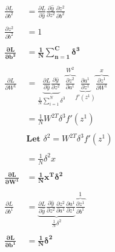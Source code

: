 \documentclass{article}
\begin{document}
	\begin{align*}
		\frac{\partial L}{\partial b^2} &= \frac{\partial L}{\partial \hat{y}}\frac{\partial \hat{y}}{\partial z^2}\frac{\partial z^2}{\partial b^2}\\ \\
		\frac{\partial z^2}{\partial b^2} &= 1\\\\
		\boldsymbol{\frac{\partial L}{\partial b^2}} & \boldsymbol{=\frac{1}{N}\sum_{n=1}^C\delta^3}
	\\
	\\
		\frac{\partial L}{\partial W^1} &=\underbrace{ \frac{\partial L}{\partial \hat{y}}\frac{\partial \hat{y}}{\partial z^2}}_{\frac{1}{N}\sum_{i=1}^N\delta^3}
			\overbrace{\frac{\partial z^2}{\partial a^1}}^{W^2}
			\underbrace{\frac{\partial a^1}{\partial z^1}}_{f'(z^1)}
			\overbrace{\frac{\partial z^1}{\partial W^1}}^x\\ \\
		&= \frac{1}{N}W^{2T}\delta^3f'(z^1)\\ \\
		& \textbf{Let } \delta^2 = W^{2T}\delta^3f'(z^1)\\ \\
		&= \frac{1}{N}\delta^2x\\ \\
		\boldsymbol{\frac{\partial L}{\partial W^1}} & \boldsymbol{= \frac{1}{N}x^T\delta^2}
	\\
	\\
		\frac{\partial L}{\partial b^1} &= \underbrace{\frac{\partial L}{\partial \hat{y}}
			\frac{\partial \hat{y}}{\partial z^2}
			\frac{\partial z^2}{\partial a^1}
			\frac{\partial a^1}{\partial z^1}}_{\frac{1}{N}\delta^2}
			\overbrace{\frac{\partial z^1}{\partial b^1}}^1\\ \\
		\boldsymbol{\frac{\partial L}{\partial b^1}} &\boldsymbol{= \frac{1}{N}\delta^2}\\ \\
	\end{align*}
	
\end{document}
